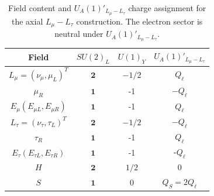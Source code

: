 \documentclass[onecolumn, aps, nofootinbib, prd, preprint, floats, floatfix, amsmath, amssymb, superscriptaddress, preprintnumbers]{revtex4-1}
\begin{document}
\begin{table}[htbp]
    \centering
    \begin{tabular}{cccc}
    \hline
    Field & $SU(2)_L$ & $U(1)_Y$ & $U_A(1)'_{L_\mu-L_\tau}$ \\
    \hline
    $L_{\mu}=\left(\nu_{\mu}, \mu_L\right)^T$ & $\mathbf{2}$ & $-1 / 2$ & $Q_{\ell}$ \\
    \hline
    $\mu_R$ & $\mathbf{1}$ & -1 & $-Q_\ell$ \\
    \hline
    $E_\mu\left(E_{\mu L}, E_{\mu R}\right)$ & $\mathbf{1}$ & -1 & $Q_\ell$\\
    \hline
    $L_{\tau}=\left(\nu_{\tau}, \tau_L\right)^T$ & $\mathbf{2}$ & $-1 / 2$ & $-Q_\ell$ \\
    \hline
    $\tau_R$ & $\mathbf{1}$ & -1 & $Q_\ell$ \\
    \hline
    $E_\tau\left(E_{\tau L}, E_{\tau R}\right)$ & $\mathbf{1}$ & -1 & -$Q_\ell$\\
    \hline
    $H$ & $\mathbf{2}$ & $1 / 2$ & 0 \\
    $S$ & $\mathbf{1}$ & 0 & $Q_S=2Q_\ell$\\
    \hline
    \end{tabular}
    \caption{Field content and \(U_A(1)'_{L_\mu-L_\tau}\) charge assignment for the axial \(L_\mu-L_\tau\) construction. The electron sector is neutral under \(U_A(1)'_{L_\mu-L_\tau}\).}
    \label{tab:charge-assignment}
\end{table}
\end{document}
